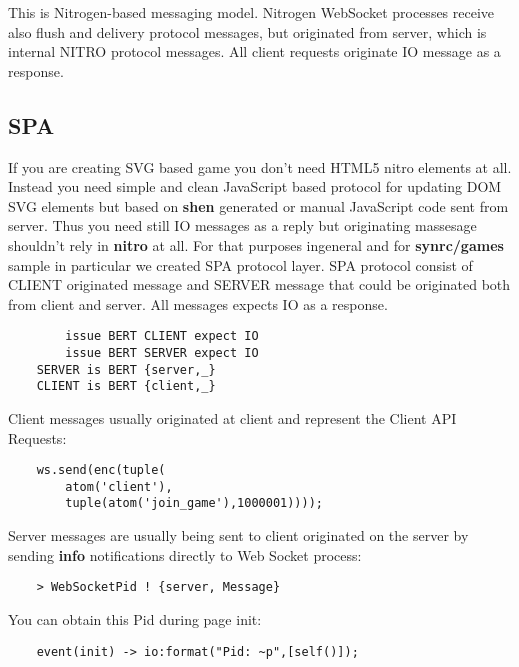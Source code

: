 This is Nitrogen-based messaging model. Nitrogen WebSocket processes receive also
flush and delivery protocol messages, but originated from server, which is internal
NITRO protocol messages. All client requests originate IO message as a response.

\newpage
\subsection{SPA}

If you are creating SVG based game you don't need HTML5 nitro elements at all.
Instead you need simple and clean JavaScript based protocol for updating DOM SVG elements
but based on {\bf shen} generated or manual JavaScript code sent from server.
Thus you need still IO messages as a reply but originating massesage shouldn't
rely in {\bf nitro} at all. For that purposes ingeneral and for {\bf synrc/games} sample
in particular we created SPA protocol layer. SPA protocol consist of CLIENT originated message
and SERVER message that could be originated both from client and server. All messages expects
IO as a response.

\vspace{1\baselineskip}
\begin{lstlisting}
        issue BERT CLIENT expect IO
        issue BERT SERVER expect IO
    SERVER is BERT {server,_}
    CLIENT is BERT {client,_}
\end{lstlisting}
\vspace{1\baselineskip}

Client messages usually originated at client and represent the Client API Requests:

\vspace{1\baselineskip}
\begin{lstlisting}
    ws.send(enc(tuple(
        atom('client'),
        tuple(atom('join_game'),1000001))));
\end{lstlisting}
\vspace{1\baselineskip}

Server messages are usually being sent to client originated on the
server by sending {\bf info} notifications directly to Web Socket process:

\begin{lstlisting}
    > WebSocketPid ! {server, Message}
\end{lstlisting}

You can obtain this Pid during page init:

\begin{lstlisting}
    event(init) -> io:format("Pid: ~p",[self()]);
\end{lstlisting}

